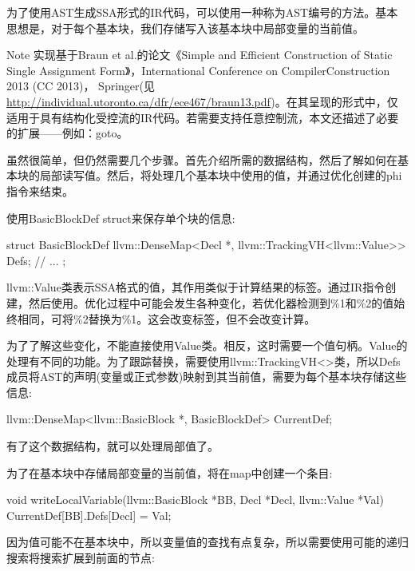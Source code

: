 
为了使用AST生成SSA形式的IR代码，可以使用一种称为AST编号的方法。基本思想是，对于每个基本块，我们存储写入该基本块中局部变量的当前值。

\begin{myNotic}{Note}
实现基于Braun et al.的论文《Simple and Efficient Construction of Static Single Assignment Form》，International Conference on CompilerConstruction 2013 (CC 2013)， Springer(见\url{http://individual.utoronto.ca/dfr/ece467/braun13.pdf})。在其呈现的形式中，仅适用于具有结构化受控流的IR代码。若需要支持任意控制流，本文还描述了必要的扩展——例如：goto。
\end{myNotic}

虽然很简单，但仍然需要几个步骤。首先介绍所需的数据结构，然后了解如何在基本块的局部读写值。然后，将处理几个基本块中使用的值，并通过优化创建的phi指令来结束。


使用BasicBlockDef struct来保存单个块的信息:

\begin{cpp}
struct BasicBlockDef {
    llvm::DenseMap<Decl *, llvm::TrackingVH<llvm::Value>> Defs;
    // ...
};
\end{cpp}

llvm::Value类表示SSA格式的值，其作用类似于计算结果的标签。通过IR指令创建，然后使用。优化过程中可能会发生各种变化，若优化器检测到\%1和\%2的值始终相同，可将\%2替换为\%1。这会改变标签，但不会改变计算。

为了了解这些变化，不能直接使用Value类。相反，这时需要一个值句柄。Value的处理有不同的功能。为了跟踪替换，需要使用llvm::TrackingVH<>类，所以Defs成员将AST的声明(变量或正式参数)映射到其当前值，需要为每个基本块存储这些信息:

\begin{cpp}
llvm::DenseMap<llvm::BasicBlock *, BasicBlockDef> CurrentDef;
\end{cpp}

有了这个数据结构，就可以处理局部值了。


为了在基本块中存储局部变量的当前值，将在map中创建一个条目:

\begin{cpp}
void writeLocalVariable(llvm::BasicBlock *BB, Decl *Decl,
                        llvm::Value *Val) {
    CurrentDef[BB].Defs[Decl] = Val;
}
\end{cpp}

因为值可能不在基本块中，所以变量值的查找有点复杂，所以需要使用可能的递归搜索将搜索扩展到前面的节点:

